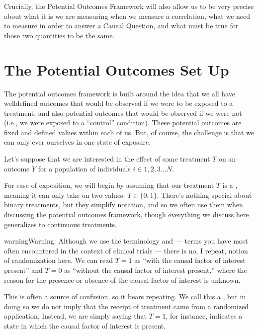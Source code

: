 \documentclass[letterpaper,10pt,english]{jupyterBook}
\begin{document}
\sphinxAtStartPar
Crucially, the Potential Outcomes Framework will also allow us to be very precise about what it is we are measuring when we measure a correlation, what we need to measure in order to answer a Causal Question, and what must be true for those two quantities to be the same.


\section{The Potential Outcomes Set Up}
\label{\detokenize{35_causal/10_potential_outcomes:the-potential-outcomes-set-up}}
\sphinxAtStartPar
The potential outcomes framework is built around the idea that we all have well\sphinxhyphen{}defined  outcomes that would be observed if we were to be exposed to a treatment, and also potential outcomes that would be observed if we were not (i.e., we were exposed to a “control” condition). These potential outcomes are fixed and defined values within each of us. But, of course, the challenge is that we can only ever  ourselves in one state of exposure.

\sphinxAtStartPar
Let’s suppose that we are interested in the effect of some treatment \(T\) on an outcome \(Y\) for a population of individuals \(i \in {1, 2, 3... N}\).

\sphinxAtStartPar
For ease of exposition, we will begin by assuming that our treatment \(T\) is a , meaning it can only take on two values: \(T \in \{0, 1\}\). There’s nothing special about binary treatments, but they simplify notation, and so we often use them when discussing the potential outcomes framework, though everything we discuss here generalizes to continuous treatments.

\begin{sphinxadmonition}{warning}{Warning:}
\sphinxAtStartPar
Although we use the terminology  and  — terms you have most often encountered in the context of clinical trials — there is no, I repeat,  notion of randomization here. We can read \(T=1\) as “with the causal factor of interest present” and \(T=0\) as “without the causal factor of interest present,” where the reason for the presence or absence of the causal factor of interest is unknown.

\sphinxAtStartPar
This is often a source of confusion, so it bears repeating. We call this a , but in doing so we do not imply that the receipt of treatment came from a randomized application. Instead, we are simply saying that \(T=1\), for instance, indicates a state in which the causal factor of interest is present.
\end{sphinxadmonition}
\end{document}
